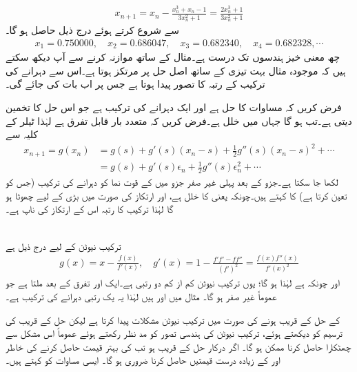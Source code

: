 \begin{align*}
x_{n+1}=x_n-\frac{x_n^3+x_n-1}{3x_n^2+1}=\frac{2x_n^3+1}{3x_n^2+1}
\end{align*}
 سے شروع کرتے ہوئے درج ذیل حاصل ہو گا۔
\begin{align*}
x_1=\num{0.750000},\quad x_2=\num{0.686047},\quad x_3=\num{0.682340},\quad x_4=\num{0.682328},\cdots
\end{align*}
 چھ معنی خیز ہندسوں تک درست ہے۔مثال  کے ساتھ موازنہ کرنے سے آپ دیکھ سکتے ہیں کہ موجودہ مثال بہت تیزی کے ساتھ اصل حل پر مرتکز ہوتا ہے۔اس سے دہرانے کی ترکیب کے رتبہ کا تصور پیدا ہوتا ہے جس پر اب بات کی جائے گی۔

فرض کریں کہ مساوات  کا حل  ہے اور   ایک دہرانے کی ترکیب ہے جو اس حل کا تخمین  دیتی ہے۔تب  ہو گا جہاں  میں خلل  ہے۔فرض کریں کہ  متعدد بار قابل تفرق ہے لہٰذا ٹیلر کے کلیہ سے 
\begin{align*}
x_{n+1}=g(x_n)&=g(s)+g'(s)(x_n-s)+\frac{1}{2}g''(s)(x_n-s)^2+\cdots\\
&=g(s)+g'(s)\epsilon_n+\frac{1}{2}g''(s)\epsilon_n^2+\cdots
\end{align*}
لکھا  جا سکتا ہے۔جزو  کے بعد پہلی غیر صفر جزو میں  کے قوت نما کو دہرانے کی ترکیب (جس کو  تعین کرتا ہے) کا  کہتے ہیں۔چونکہ  یعنی  کا خلل ہے، اور ارتکاز کی صورت میں بڑی  کے لیے  چھوٹا ہو گا لہٰذا ترکیب کا رتبہ اس کے ارتکاز کی ناپ ہے۔

\\
ترکیب نیوٹن کے لیے درج ذیل ہے
\begin{align*} 
g(x)=x-\frac{f(x)}{f'(x)},\quad g'(x)=1-\frac{f'f'-ff''}{(f')^2}=\frac{f(x)f''(x)}{f'(x)^2}
\end{align*} 
اور چونکہ  ہے لہٰذا  ہو گا؛ یوں ترکیب نیوٹن کم از کم دو رتبی ہے۔ایک اور تفرق کے بعد  ملتا ہے جو عموماً غیر صفر ہو گا۔ مثال  میں  اور  ہیں لہٰذا یہ یک رتبی دہرانے کی ترکیب ہے۔

 کے حل کے قریب  ہونے کی صورت میں ترکیب نیوٹن مشکلات پیدا کرتا ہے لیکن حل کے قریب  کی ترسیم  کو دیکھتے ہوئے، ترکیب نیوٹن کی ہندسی تصور کو مد نظر رکھتے ہوئے عموماً  اس مشکل سے چھٹکارا حاصل کرنا ممکن ہو گا۔ اگر درکار حل کے قریب  ہو تب  کی بہتر قیمت حاصل کرنے کی خاطر   اور  کے زیادہ درست قیمتیں حاصل کرنا ضروری ہو گا۔ ایسی مساوات کو  کہتے ہیں۔

